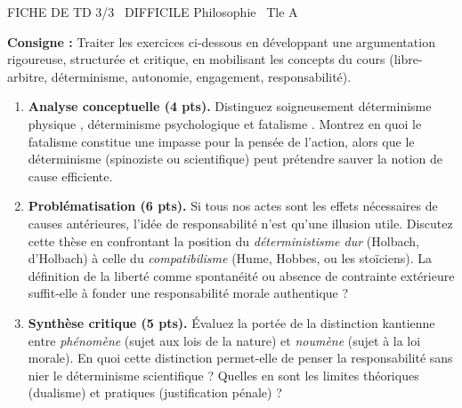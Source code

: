 \documentclass[11pt]{article}
\begin{document}
\begin{tcolorbox}[enhanced,colback=popink,colframe=popink,arc=10pt,boxrule=0pt,left=12pt,right=12pt,top=9pt,bottom=9pt]
{\color{white}\popxbold\small FICHE DE TD 3/3 \textbullet\ DIFFICILE \hfill Philosophie \textbullet\ Tle A\par}
\end{tcolorbox}
\vspace{4pt}
\noindent \textbf{Consigne :} Traiter les exercices ci-dessous en développant une argumentation rigoureuse, structurée et critique, en mobilisant les concepts du cours (libre-arbitre, déterminisme, autonomie, engagement, responsabilité).

\begin{exercice}
\begin{enumerate}
    \item \textbf{Analyse conceptuelle (4 pts).} Distinguez soigneusement \og déterminisme physique \fg{}, \og déterminisme psychologique \fg{} et \og fatalisme \fg{}. Montrez en quoi le fatalisme constitue une impasse pour la pensée de l'action, alors que le déterminisme (spinoziste ou scientifique) peut prétendre sauver la notion de cause efficiente.
    \item \textbf{Problématisation (6 pts).} \og Si tous nos actes sont les effets nécessaires de causes antérieures, l'idée de responsabilité n'est qu'une illusion utile. \fg{} Discutez cette thèse en confrontant la position du \textit{déterministisme dur} (Holbach, d'Holbach) à celle du \textit{compatibilisme} (Hume, Hobbes, ou les stoïciens). La définition de la liberté comme \og spontanéité \fg{} ou \og absence de contrainte extérieure \fg{} suffit-elle à fonder une responsabilité morale authentique ?
    \item \textbf{Synthèse critique (5 pts).} Évaluez la portée de la distinction kantienne entre \textit{phénomène} (sujet aux lois de la nature) et \textit{noumène} (sujet à la loi morale). En quoi cette distinction permet-elle de penser la responsabilité sans nier le déterminisme scientifique ? Quelles en sont les limites théoriques (dualisme) et pratiques (justification pénale) ?
\end{enumerate}
\end{exercice}
\end{document}
